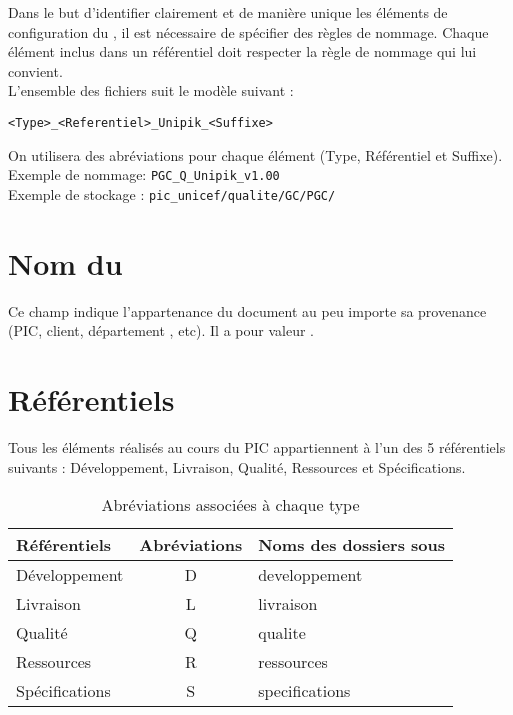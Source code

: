 
Dans le but d'identifier clairement et de manière unique les éléments de configuration du \picCourt{}, il est nécessaire de spécifier des règles de nommage. Chaque élément inclus dans un référentiel doit respecter la règle de nommage qui lui convient.\\

L'ensemble des fichiers suit le modèle suivant :
\begin{center}
  \verb+<Type>_<Referentiel>_Unipik_<Suffixe>+
\end{center}
On utilisera des abréviations pour chaque élément (Type, Référentiel et Suffixe).\\
Exemple de nommage: \verb+PGC_Q_Unipik_v1.00+\\
Exemple de stockage : \verb+pic_unicef/qualite/GC/PGC/+


\section{Nom du \picCourt{}}
Ce champ indique l'appartenance du document au \PICCourt{} peu importe sa provenance
 (PIC, client, département \ASI{}, etc). Il a pour valeur \textbf{\nomEquipe}.

\section{Référentiels}

Tous les éléments réalisés au cours du PIC appartiennent à l'un des 5 référentiels suivants : Développement, Livraison, Qualité, Ressources et Spécifications.
\begin{table}[H]
\centering
	\begin{tabularx}{11cm}{|X|c|X|}
	\hline
	\rowcolor[gray]{0.85} Référentiels & Abréviations & Noms des dossiers sous \git{} \\
	\hline
	Développement & D & developpement\\
	\hline
	Livraison & L & livraison\\
	\hline
	Qualité & Q & qualite\\
	\hline	
	Ressources & R & ressources\\
	\hline 
	Spécifications & S & specifications\\ 
	\hline
	\end{tabularx}
\caption{Abréviations associées à chaque type}
\label{Référentiel}
\end{table}

